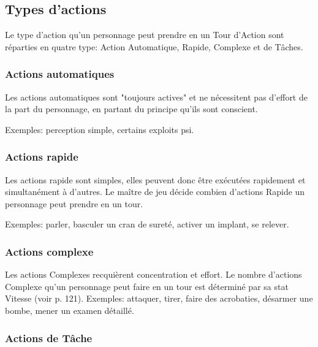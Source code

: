 \subsection{Types d'actions} \label{sec:types-actions} 

Le type d'action qu'un personnage peut prendre en un Tour d'Action sont réparties en quatre type: Action Automatique, Rapide, Complexe et de Tâches. 

\subsubsection{Actions automatiques} \label{sec:automatic-actions} 

Les actions automatiques sont "toujours actives" et ne nécessitent pas d'effort de la part du personnage, en partant du principe qu'ils sont conscient. 

Exemples: perception simple, certains exploits psi. 

\subsubsection{Actions rapide} \label{sec:quick-actions} 

Les actions rapide sont simples, elles peuvent donc être exécutées rapidement et simultanément à d'autres. Le maître de jeu décide combien d'actions Rapide un personnage peut prendre en un tour. 

Exemples: parler, basculer un cran de sureté, activer un implant, se relever. 

\subsubsection{Actions complexe} \label{sec:complex-actions} 

Les actions Complexes recquièrent concentration et effort. Le nombre d'actions Complexe qu'un personnage peut faire en un tour est déterminé par sa stat Vitesse (voir p. 121). Exemples: attaquer, tirer, faire des acrobaties, désarmer une bombe, mener un examen détaillé. 

\subsubsection{Actions de Tâche} \label{sec:task-actions} 

